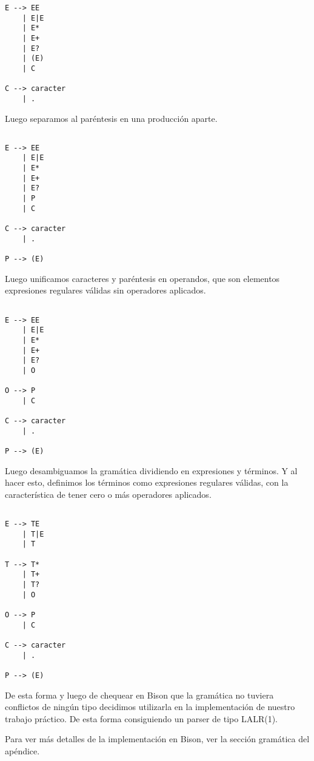 \begin{lstlisting}
E --> EE
    | E|E
    | E*
    | E+
    | E?
    | (E)
    | C

C --> caracter
    | .
\end{lstlisting}

Luego separamos al paréntesis en una producción aparte. 

\begin{lstlisting}

E --> EE
    | E|E
    | E*
    | E+
    | E?
    | P
    | C

C --> caracter
    | .

P --> (E)

\end{lstlisting}

Luego unificamos caracteres y paréntesis en operandos, 
que son elementos expresiones regulares válidas sin operadores aplicados. 

\begin{lstlisting}

E --> EE
    | E|E
    | E*
    | E+
    | E?
    | O

O --> P
    | C

C --> caracter
    | .

P --> (E)

\end{lstlisting}

Luego desambiguamos la gramática dividiendo en expresiones y términos. 
Y al hacer esto, definimos los términos como expresiones regulares válidas, 
con la característica de tener cero o más operadores aplicados. 

\begin{lstlisting}

E --> TE
    | T|E
    | T

T --> T*
    | T+
    | T?
    | O

O --> P
    | C

C --> caracter
    | .

P --> (E)

\end{lstlisting}

De esta forma y luego de chequear en Bison que la gramática no tuviera 
conflictos de ningún tipo decidimos utilizarla en la implementación 
de nuestro trabajo práctico. De esta forma consiguiendo un parser de tipo LALR(1).

Para ver más detalles de la implementación en Bison, ver la sección gramática 
del apéndice. 
